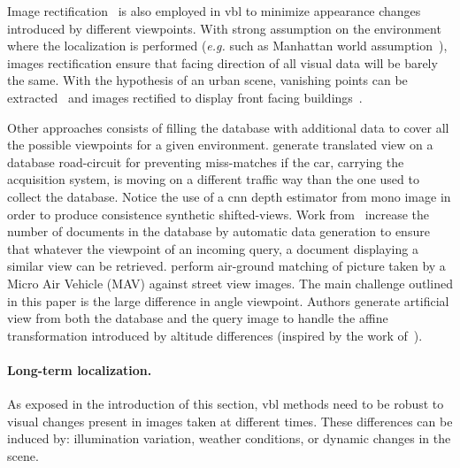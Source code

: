 			Image rectification~\citep{Forstner2016} is also employed in \ac{vbl} to minimize appearance changes introduced by different viewpoints. With strong assumption on the environment where the localization is performed (\textit{e.g.} such as Manhattan world assumption~\citep{Murillo2013,Cham2010}), images rectification ensure that facing direction of all visual data will be barely the same. With the hypothesis of an urban scene, vanishing points can be extracted~\citep{Lezama2014,Hartley2003,Forstner2016} and images rectified to display front facing buildings~\citep{Robertson2004,Chen2011,Morago2016,Arth2015,Cham2010}.
			
			Other approaches consists of filling the database with additional data to cover all the possible viewpoints for a given environment. \citet{Milford2015} generate translated view on a database road-circuit for preventing miss-matches if the car, carrying the acquisition system, is moving on a different traffic way than the one used to collect the database. Notice the use of a \ac{cnn} depth estimator from mono image in order to produce consistence synthetic shifted-views. Work from~\citep{Irschara2009,Aubry2014,Torii2015} increase the number of documents in the database by automatic data generation to ensure that whatever the viewpoint of an incoming query, a document displaying a similar view can be retrieved. \citet{Majdik2013} perform air-ground matching of picture taken by a Micro Air Vehicle (MAV) against street view images. The main challenge outlined in this paper is the large difference in angle viewpoint. Authors generate artificial view from both the database and the query image to handle the affine transformation introduced by altitude differences (inspired by the work of~\citep{Morel2009}).			
			
		\paragraph{Long-term localization.}
	       	\label{para:illum}
			As exposed in the introduction of this section, \ac{vbl} methods need to be robust to visual changes present in images taken at different times. These differences can be induced by: illumination variation, weather conditions, or dynamic changes in the scene.
			
